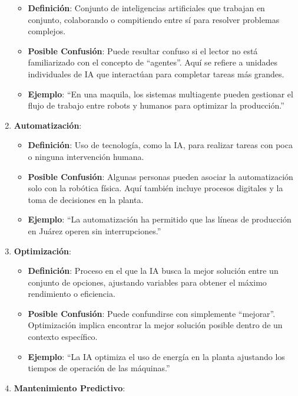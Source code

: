 \documentclass[
  10pt,
  letterpaper,
]{book}
\providecommand{\tightlist}{%
  \setlength{\itemsep}{0pt}\setlength{\parskip}{0pt}}\usepackage{longtable,booktabs,array}
\begin{document}
\begin{enumerate}
  \begin{itemize}
  \tightlist
  \item
    \textbf{Definición}: Conjunto de inteligencias artificiales que
    trabajan en conjunto, colaborando o compitiendo entre sí para
    resolver problemas complejos.
  \item
    \textbf{Posible Confusión}: Puede resultar confuso si el lector no
    está familiarizado con el concepto de ``agentes''. Aquí se refiere a
    unidades individuales de IA que interactúan para completar tareas
    más grandes.
  \item
    \textbf{Ejemplo}: ``En una maquila, los sistemas multiagente pueden
    gestionar el flujo de trabajo entre robots y humanos para optimizar
    la producción.''
  \end{itemize}
\item
  \textbf{Automatización}:

  \begin{itemize}
  \tightlist
  \item
    \textbf{Definición}: Uso de tecnología, como la IA, para realizar
    tareas con poca o ninguna intervención humana.
  \item
    \textbf{Posible Confusión}: Algunas personas pueden asociar la
    automatización solo con la robótica física. Aquí también incluye
    procesos digitales y la toma de decisiones en la planta.
  \item
    \textbf{Ejemplo}: ``La automatización ha permitido que las líneas de
    producción en Juárez operen sin interrupciones.''
  \end{itemize}
\item
  \textbf{Optimización}:

  \begin{itemize}
  \tightlist
  \item
    \textbf{Definición}: Proceso en el que la IA busca la mejor solución
    entre un conjunto de opciones, ajustando variables para obtener el
    máximo rendimiento o eficiencia.
  \item
    \textbf{Posible Confusión}: Puede confundirse con simplemente
    ``mejorar''. Optimización implica encontrar la mejor solución
    posible dentro de un contexto específico.
  \item
    \textbf{Ejemplo}: ``La IA optimiza el uso de energía en la planta
    ajustando los tiempos de operación de las máquinas.''
  \end{itemize}
\item
  \textbf{Mantenimiento Predictivo}:


\end{enumerate}
\end{document}
